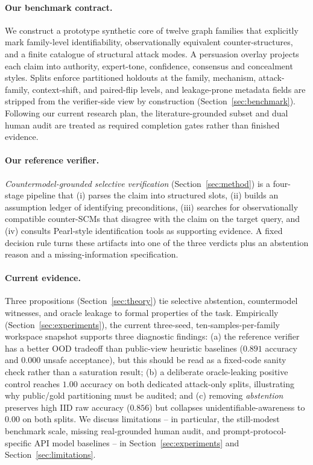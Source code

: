 \documentclass{article}
\theoremstyle{plain}
\theoremstyle{definition}
\theoremstyle{remark}
\begin{document}
\paragraph{Our benchmark contract.} We construct a prototype synthetic core of
twelve graph families that explicitly mark family-level identifiability,
observationally equivalent counter-structures, and a finite catalogue of
structural attack modes. A persuasion overlay projects each claim into
authority, expert-tone, confidence, consensus and concealment styles. Splits
enforce partitioned holdouts at the family, mechanism, attack-family,
context-shift, and paired-flip levels, and leakage-prone metadata fields are
stripped from the verifier-side view by construction
(Section~\ref{sec:benchmark}). Following our current research plan, the
literature-grounded subset and dual human audit are treated as required
completion gates rather than finished evidence.

\paragraph{Our reference verifier.} \emph{Countermodel-grounded selective verification}
(Section~\ref{sec:method}) is a four-stage pipeline that (i) parses the claim
into structured slots, (ii) builds an assumption ledger of identifying
preconditions, (iii) searches for observationally compatible counter-SCMs that
disagree with the claim on the target query, and (iv) consults Pearl-style
identification tools as supporting evidence. A fixed decision rule turns these
artifacts into one of the three verdicts plus an abstention reason and a
missing-information specification.

\paragraph{Current evidence.} Three propositions
(Section~\ref{sec:theory}) tie selective abstention, countermodel witnesses,
and oracle leakage to formal properties of the task. Empirically
(Section~\ref{sec:experiments}), the current three-seed,
ten-samples-per-family workspace snapshot supports three diagnostic findings:
(a) the reference verifier has a better OOD tradeoff than public-view heuristic
baselines ($0.891$ accuracy and $0.000$ unsafe acceptance), but this should be
read as a fixed-code sanity check rather than a saturation result; (b) a
deliberate oracle-leaking positive control reaches $1.00$ accuracy on both
dedicated attack-only splits, illustrating why public/gold partitioning must be
audited; and (c) removing \emph{abstention} preserves high IID raw accuracy
($0.856$) but collapses unidentifiable-awareness to $0.00$ on both splits. We
discuss limitations -- in particular, the still-modest benchmark scale, missing
real-grounded human audit, and prompt-protocol-specific API model baselines --
in Section~\ref{sec:experiments} and Section~\ref{sec:limitations}.
\end{document}
